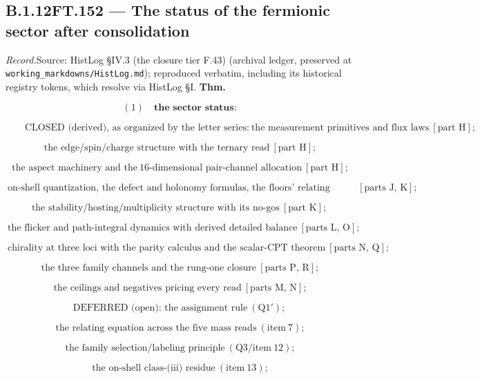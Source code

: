\documentclass[11pt,openany]{report}
\theoremstyle{canonplain}
\theoremstyle{canondef}
\begin{document}
\medskip
\subsection*{\texorpdfstring{B.1.12\quad FT.152 — The status of the fermionic sector after consolidation}{FT.152 B.1.12}}
\label{tag:FT-152}
{\small \textit{Record.}\quad Source: HistLog §IV.3 (the closure tier F.43) (archival ledger, preserved at \texttt{working\_markdowns/HistLog.md}); reproduced verbatim, including its historical registry tokens, which resolve via HistLog \S I.}
\medskip
\textbf{Thm.}

\[
(1)\quad\textbf{the sector status:}
\]

\[
\qquad \text{CLOSED (derived), as organized by the letter series:}\ \text{the measurement primitives and flux laws}\ [\text{part H}];
\]

\[
\ \text{the edge/spin/charge structure with the ternary read}\ [\text{part H}];
\]

\[
\ \text{the aspect machinery and the}\ 16\text{-dimensional pair-channel allocation}\ [\text{part H}];
\]

\[
\ \text{on-shell quantization, the defect and holonomy formulas, the floors' relating equation}\ [\text{parts J, K}];
\]

\[
\text{the stability/hosting/multiplicity structure with its no-gos}\ [\text{part K}];
\]

\[
\ \text{the flicker and path-integral dynamics with derived detailed balance}\ [\text{parts L, O}];
\]

\[
\ \text{chirality at three loci with the parity calculus and the scalar-CPT theorem}\ [\text{parts N, Q}];
\]

\[
\ \text{the three family channels and the rung-one closure}\ [\text{parts P, R}];
\]

\[
\ \text{the ceilings and negatives pricing every read}\ [\text{parts M, N}];
\]

\[
\text{DEFERRED (open): the assignment rule}\ (\text{Q1}');
\]

\[
\ \text{the relating equation across the five mass reads}\ (\text{item}\ 7);
\]

\[
\ \text{the family selection/labeling principle}\ (\text{Q3/item}\ 12);
\]

\[
\ \text{the on-shell class-(iii) residue}\ (\text{item}\ 13);
\]
\end{document}
